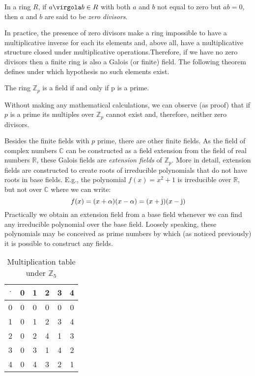 \begin{Def}
In a ring $R$, if \(a \virgola b \in R\) with both $a$ and $b$ not equal to zero but \(ab = 0\), then $a$ and $b$ are said to be \emph{zero divisors}.
\end{Def}
In practice, the presence of zero divisors make a ring impossible to have a multiplicative inverse for each its elements and, above all, have a multiplicative structure closed under multiplicative operations.Therefore, if we have no zero divisors then a finite ring is also a Galois (or finite) field. The following theorem defines under which hypothesis no such elements exist.

\begin{Theorem}
The ring \( \mathbb Z_p\) is a field if and only if p is a prime.   \label{th:subgf}
\end{Theorem}
Without making any mathematical calculations, we can observe (as proof) that if $p$ is a prime its multiples over \( \mathbb Z_p\) cannot exist and, therefore, neither zero divisors.

Besides the finite fields with $p$ prime, there are other finite fields. As the field of complex numbers \( \mathbb C\) can be constructed as a field extension from the field of real numbers \(\mathbb R\), these Galois fields are \emph{extension fields} of \( \mathbb Z_p\). More in detail, extension fields are constructed to create roots of irreducible polynomials that do not have roots in base fields. E.g., the  polynomial \(f(x) = x^2+1\) is irreducible over \(\mathbb R\), but not over \(\mathbb C\) where we can write:
\begin{equation}
f(x)=(x+\alpha)(x-\alpha)=(x+\operatorname{\mathrm{j\mathstrut}})(x-\operatorname{\mathrm{j\mathstrut}})
\end{equation}
Practically we obtain an extension field from a base field whenever we can find any irreducible polynomial over the base field. Loosely speaking, these polynomials may be conceived as prime numbers by which (as noticed previously) it is possible to construct any fields.

\begin{table}\centering
\begin{tabular}{c| c c c c c}
$\cdot$ & 0 & 1 & 2 & 3 & 4\\
\hline
0 & 0 & 0 & 0 & 0 & 0\\
1 & 0 & 1 & 2 & 3 & 4\\
2 & 0 & 2 & 4 & 1 & 3\\
3 & 0 & 3 & 1 & 4 & 2\\
4 & 0 & 4 & 3 & 2 & 1 \\
\end{tabular}
\caption{Multiplication table under \( \mathbb Z_5\)} \label{tb:Fieldmod5}
\end{table}


